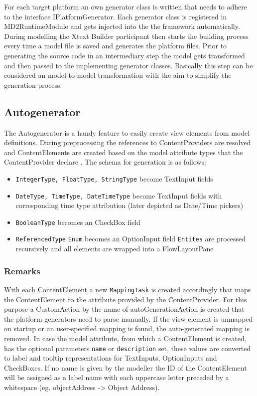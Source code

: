 
For each target platform an own generator class is written that needs to adhere to the interface IPlatformGenerator. Each generator class is registered in MD2RuntimeModule and gets injected into the the framework automatically. During modelling the Xtext Builder participant then starts the building process every time a model file is saved and generates the platform files.
Prior to generating the source code in an intermediary step the model gets transformed and then passed to the implementing generator classes. Basically this step can be considered an model-to-model transformation with the aim to simplify the generation process.
\subsection{Autogenerator}
The Autogenerator is a handy feature to easily create view elements from model definitions. During preprocessing the references to ContentProviders are resolved and ContentElements are created based on the model attribute types that the ContentProvider declare . The schema for generation is as follows:

\begin{itemize}
\item \lstinline!IntegerType, FloatType, StringType! become TextInput fields
\item \lstinline!DateType, TimeType, DateTimeType! become TextInput fields with corresponding time type attribution (later depicted as Date/Time pickers)
\item \lstinline!BooleanType! becomes an CheckBox field
\item \lstinline!ReferencedType!
\subitem \lstinline!Enum! becomes an OptionInput field
\subitem \lstinline!Entites! are processed recursively and all elements are wrapped into a FlowLayoutPane
\end{itemize}

\subsubsection{Remarks}
With each ContentElement a new \lstinline!MappingTask! is created accordingly that maps the ContentElement to the attribute provided by the ContentProvider. For this purpose a CustomAction by the name of autoGenerationAction is created that the platform generators need to parse manually. If the view element is unmapped on startup or an user-specified mapping is found, the auto-generated mapping is removed.
In case the model attribute, from which a ContentElement is created, has the optional parameters \lstinline!name! or \lstinline!description! set, these values are converted to label and tooltip representations for TextInputs, OptionInputs and CheckBoxes. If no name is given by the modeller the ID of the ContentElement will be assigned as a label name with each uppercase letter preceded by a whitespace (eg. objectAddress -> Object Address).

